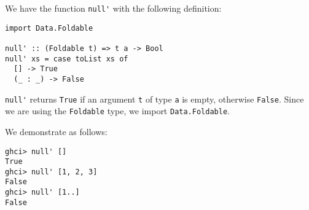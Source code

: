 
We have the function \verb|null'| with the following definition:
\begin{verbatim}
import Data.Foldable

null' :: (Foldable t) => t a -> Bool
null' xs = case toList xs of
  [] -> True
  (_ : _) -> False
\end{verbatim}
\verb|null'| returns \verb|True| if an argument \verb|t| of type \verb|a| 
is empty, otherwise \verb|False|. Since we are using the \verb|Foldable| 
type, we import \verb|Data.Foldable|.\par
\qquad We demonstrate as follows:
\begin{verbatim}
ghci> null' []
True
ghci> null' [1, 2, 3]
False
ghci> null' [1..]
False
\end{verbatim}
